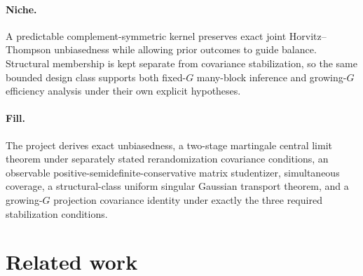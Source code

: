 \documentclass{article}
\begin{document}
\paragraph{Niche.} A predictable complement-symmetric kernel preserves exact joint Horvitz--Thompson unbiasedness while allowing prior outcomes to guide balance.  Structural membership is kept separate from covariance stabilization, so the same bounded design class supports both fixed-\(G\) many-block inference and growing-\(G\) efficiency analysis under their own explicit hypotheses.

\paragraph{Fill.} The project derives exact unbiasedness, a two-stage martingale central limit theorem under separately stated rerandomization covariance conditions, an observable positive-semidefinite-conservative matrix studentizer, simultaneous coverage, a structural-class uniform singular Gaussian transport theorem, and a growing-\(G\) projection covariance identity under exactly the three required stabilization conditions.

\section{Related work}
\end{document}
